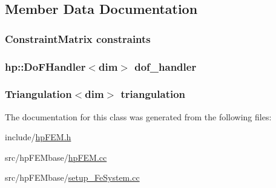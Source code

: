 \subsection{Member Data Documentation}
\subsubsection[{constraints}]{\setlength{\rightskip}{0pt plus 5cm}Constraint\-Matrix constraints}\label{classhp_f_e_m_aa08dcec4445eed1687b99cdb7b24b785}
\subsubsection[{dof\-\_\-handler}]{\setlength{\rightskip}{0pt plus 5cm}hp\-::\-Do\-F\-Handler$<$dim$>$ dof\-\_\-handler}\label{classhp_f_e_m_ab4df20fb431f370878adc06e19280d62}
\subsubsection[{triangulation}]{\setlength{\rightskip}{0pt plus 5cm}Triangulation$<$dim$>$ triangulation}\label{classhp_f_e_m_a1e604d1e68926caf1ebc67d2a7451783}


The documentation for this class was generated from the following files\-:\begin{DoxyCompactItemize}
\item 
include/\hyperlink{hp_f_e_m_8h}{hp\-F\-E\-M.\-h}\item 
src/hp\-F\-E\-Mbase/\hyperlink{hp_f_e_m_8cc}{hp\-F\-E\-M.\-cc}\item 
src/hp\-F\-E\-Mbase/\hyperlink{setup___fe_system_8cc}{setup\-\_\-\-Fe\-System.\-cc}\end{DoxyCompactItemize}
